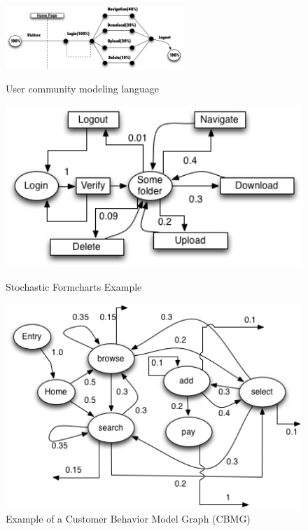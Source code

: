 \documentclass{report}
\begin{document}
\begin{figure}[!ht]
\begin{minipage}{1\textwidth}
\centering
\includegraphics[width=0.6\textwidth]{./images/ucml.png}
\caption{User community modeling language \cite{Wang2013}}
\label{fig:ucml}
\end{minipage}
\begin{minipage}{1\textwidth}
\begin{minipage}{.5\textwidth}
\centering
\includegraphics[width=1\textwidth]{./images/stochastic.png}
\caption{Stochastic Formcharts Example \cite{Draheim2006b} \cite{Wang2013}}
\label{fig:stform}
\end{minipage}
\begin{minipage}{.5\textwidth}
\centering
\includegraphics[width=1\textwidth]{./images/cbmg.png}
\caption{Example of a Customer Behavior Model Graph (CBMG)  \cite{Menasce2002a} \cite{Jiang2010} \cite{MohammadS.Obaidat}}
\label{fig:cbmg}
\end{minipage}
\end{minipage}
\end{figure}
\end{document}
